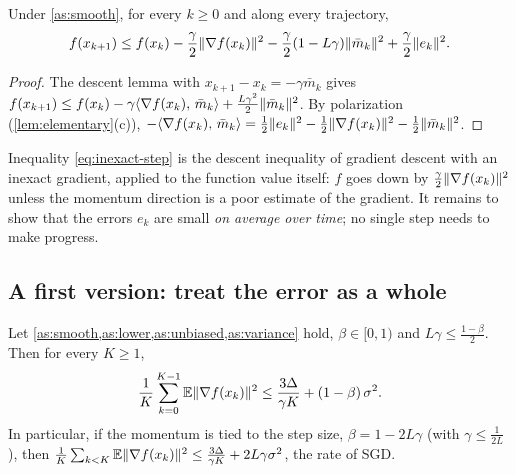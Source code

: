 \begin{lemma}\label{lem:inexact-step}
Under \cref{as:smooth}, for every $k\ge0$ and along every trajectory,
\begin{equation}\label{eq:inexact-step}
  f(x_{k+1})\le f(x_k)-\frac\gamma2\lVert \nabla f(x_k)\rVert^2-\frac\gamma2(1-L\gamma)\lVert \bar m_k\rVert^2
  +\frac\gamma2\lVert e_k\rVert^2 .
\end{equation}
\end{lemma}

\begin{proof}
The descent lemma with $x_{k+1}-x_k=-\gamma\bar m_k$ gives
$f(x_{k+1})\le f(x_k)-\gamma\langle \nabla f(x_k),\, \bar m_k\rangle+\frac{L\gamma^2}{2}\lVert \bar m_k\rVert^2$.
By polarization (\cref{lem:elementary}(c)),
$-\langle \nabla f(x_k),\, \bar m_k\rangle=\frac12\lVert e_k\rVert^2-\frac12\lVert \nabla f(x_k)\rVert^2-\frac12\lVert \bar m_k\rVert^2$.
\end{proof}

Inequality \eqref{eq:inexact-step} is the descent inequality of gradient descent with an
inexact gradient, applied to the function value itself: $f$ goes down by
$\frac\gamma2\lVert \nabla f(x_k)\rVert^2$ unless the momentum direction is a poor estimate of the
gradient. It remains to show that the errors $e_k$ are small \emph{on
average over time}; no single step needs to make progress.

\subsection{A first version: treat the error as a whole}

\begin{theorem}\label{thm:lf-simple}
Let \cref{as:smooth,as:lower,as:unbiased,as:variance} hold, $\beta\in[0,1)$ and
$L\gamma\le\frac{1-\beta}{2}$. Then for every $K\ge1$,
\[
  \frac1K\sum_{k=0}^{K-1}\mathbb{E}\lVert \nabla f(x_k)\rVert^2\le\frac{3\Delta}{\gamma K}+(1-\beta)\,\sigma^2 .
\]
In particular, if the momentum is tied to the step size, $\beta=1-2L\gamma$ (with
$\gamma\le\frac1{2L}$), then
$\frac1K\sum_{k<K}\mathbb{E}\lVert \nabla f(x_k)\rVert^2\le\frac{3\Delta}{\gamma K}+2L\gamma\sigma^2$, the rate of SGD.
\end{theorem}

